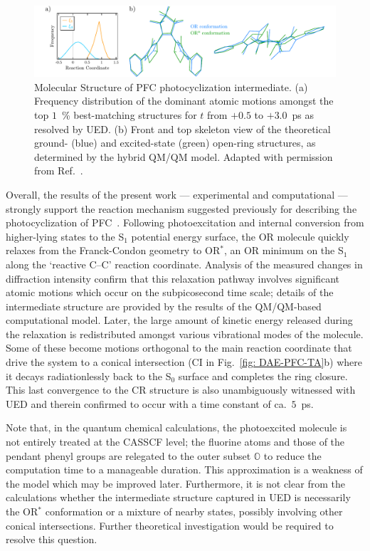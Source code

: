 \begin{figure}[t!]
  \centering
  \includegraphics[width = \textwidth]{Figures/fig_DAE_PFC_resultsQMQM.pdf}
  \caption[Molecular Structure of PFC photocyclization intermediate.]{
    Molecular Structure of PFC photocyclization intermediate.
    (a) Frequency distribution of the dominant atomic motions
    amongst the top $1$~\% best-matching structures for $t$ from $+0.5$ to $+3.0$~ps
    as resolved by UED.
    (b) Front and top skeleton view of the theoretical
    ground- (blue) and excited-state (green) open-ring structures,
    as determined by the hybrid QM/QM model.
    Adapted with permission from Ref.~\cite{Jean-Ruel2013}.
  }
  \label{fig: DAE-PFC-results-QMQM}
\end{figure}

Overall, the results of the present work --- experimental and computational ---
strongly support the reaction mechanism suggested previously for describing
the photocyclization of PFC~\cite{Boggio2003, Jean-Ruel2011}.
Following photoexcitation and internal conversion from higher-lying states
to the S$_1$ potential energy surface, the OR molecule quickly relaxes from
the Franck-Condon geometry to OR$^*$, an OR minimum on the S$_1$
along the `reactive C--C' reaction coordinate.
%
Analysis of the measured changes in diffraction intensity confirm that this relaxation pathway
involves significant atomic motions which occur on the subpicosecond time scale;
details of the intermediate structure are provided by
the results of the QM/QM-based computational model.
%
Later, the large amount of kinetic energy released during the relaxation is redistributed amongst
various vibrational modes of the molecule.
Some of these become motions orthogonal to the main reaction coordinate that drive
the system to a conical intersection (CI in Fig.~\ref{fig: DAE-PFC-TA}b)
where it decays radiationlessly back to the S$_0$ surface and completes the ring closure.
%
This last convergence to the CR structure is also unambiguously witnessed with UED
and therein confirmed to occur with a time constant of ca.~$ 5$~ps.

Note that, in the quantum chemical calculations,
the photoexcited molecule is not entirely treated at the CASSCF level;
the fluorine atoms and those of the pendant phenyl groups are relegated
to the outer subset $\mathbb{O}$ to reduce the computation time to
a manageable duration.
This approximation is a weakness of the model which may be improved later.
%
Furthermore, it is not clear from the calculations whether the intermediate structure
captured in UED is necessarily the OR$^*$ conformation
or a mixture of nearby states, possibly involving other conical intersections.
Further theoretical investigation would be required to resolve this question.


